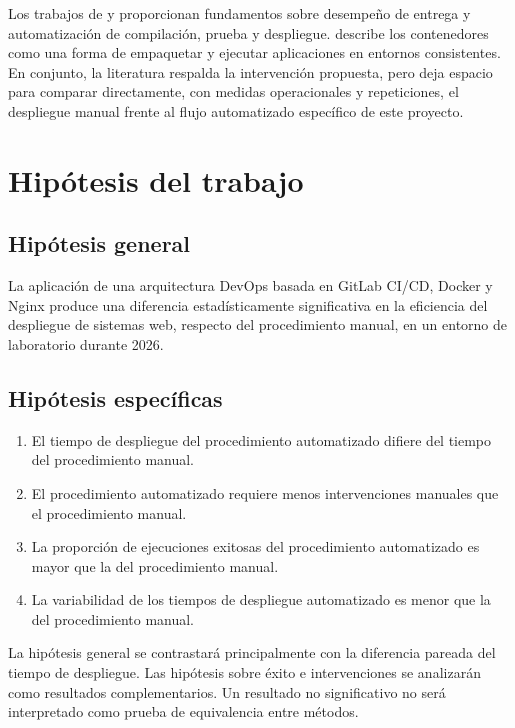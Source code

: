 \documentclass[12pt,a4paper]{article}
\begin{document}
Los trabajos de \citet{forsgren2018} y \citet{farley2010} proporcionan fundamentos sobre desempeño de entrega y automatización de compilación, prueba y despliegue. \citet{bernstein2014} describe los contenedores como una forma de empaquetar y ejecutar aplicaciones en entornos consistentes. En conjunto, la literatura respalda la intervención propuesta, pero deja espacio para comparar directamente, con medidas operacionales y repeticiones, el despliegue manual frente al flujo automatizado específico de este proyecto.

\section{Hipótesis del trabajo}

\subsection{Hipótesis general}

La aplicación de una arquitectura DevOps basada en GitLab CI/CD, Docker y Nginx produce una diferencia estadísticamente significativa en la eficiencia del despliegue de sistemas web, respecto del procedimiento manual, en un entorno de laboratorio durante 2026.

\subsection{Hipótesis específicas}

\begin{enumerate}
  \item El tiempo de despliegue del procedimiento automatizado difiere del tiempo del procedimiento manual.
  \item El procedimiento automatizado requiere menos intervenciones manuales que el procedimiento manual.
  \item La proporción de ejecuciones exitosas del procedimiento automatizado es mayor que la del procedimiento manual.
  \item La variabilidad de los tiempos de despliegue automatizado es menor que la del procedimiento manual.
\end{enumerate}

La hipótesis general se contrastará principalmente con la diferencia pareada del tiempo de despliegue. Las hipótesis sobre éxito e intervenciones se analizarán como resultados complementarios. Un resultado no significativo no será interpretado como prueba de equivalencia entre métodos.
\end{document}
